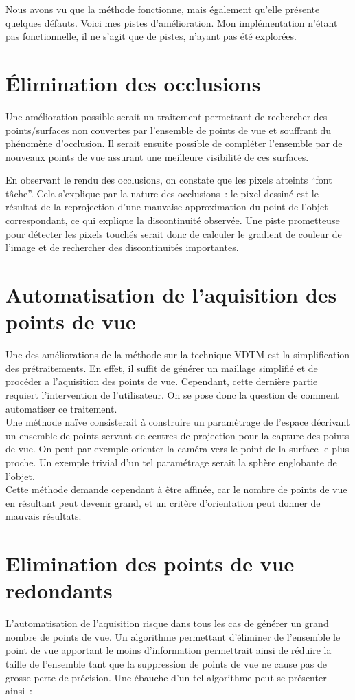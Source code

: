 Nous avons vu que la méthode fonctionne, mais également qu'elle présente quelques défauts. Voici mes pistes d'amélioration.
Mon implémentation n'étant pas fonctionnelle, il ne s'agit que de pistes, n'ayant pas été explorées.

\section{\'Elimination des occlusions}
Une amélioration possible serait un traitement permettant de rechercher des points/surfaces non couvertes par l'ensemble de points de vue
et souffrant du phénomène d'occlusion. Il serait ensuite possible de compléter l'ensemble par de nouveaux points de vue assurant une
meilleure visibilité de ces surfaces.

En observant le rendu des occlusions, on constate que les pixels atteints ``font t\^ache''. Cela s'explique par la nature des occlusions~:
le pixel dessiné est le résultat de la reprojection d'une mauvaise approximation du point de l'objet correspondant, ce qui explique la discontinuité observée.
Une piste prometteuse pour détecter les pixels touchés serait donc de calculer le gradient de couleur de l'image et de rechercher des discontinuités importantes.

\section{Automatisation de l'aquisition des points de vue}
Une des améliorations de la méthode sur la technique VDTM est la simplification des prétraitements. En effet, il
suffit de générer un maillage simplifié et de procéder a l'aquisition des points de vue. Cependant, cette dernière
partie requiert l'intervention de l'utilisateur. On se pose donc la question de comment automatiser ce traitement.\\
Une méthode naïve consisterait à construire un paramètrage de l'espace décrivant un ensemble de points servant de centres de projection
pour la capture des points de vue. On peut par exemple orienter la caméra vers le point de la surface le plus proche. Un exemple trivial
d'un tel paramétrage serait la sphère englobante de l'objet.\\
Cette méthode demande cependant à être affinée, car le nombre de points de vue en résultant peut devenir grand, et un critère d'orientation
peut donner de mauvais résultats.

\section{Elimination des points de vue redondants}
L'automatisation de l'aquisition risque dans tous les cas de générer un grand nombre de points de vue. Un algorithme
permettant d'éliminer de l'ensemble le point de vue apportant le moins d'information permettrait ainsi de réduire la taille
de l'ensemble tant que la suppression de points de vue ne cause pas de grosse perte de précision. Une ébauche d'un tel algorithme
peut se présenter ainsi~:

